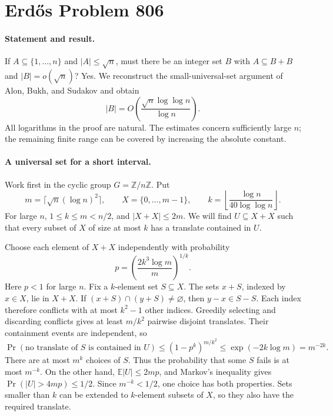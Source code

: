 \section*{Erd\H{o}s Problem 806}

\paragraph{Statement and result.}
If \(A\subseteq\{1,\ldots,n\}\) and \(|A|\leq\sqrt n\), must there be an integer set \(B\) with \(A\subseteq B+B\) and \(|B|=o(\sqrt n)\)? Yes. We reconstruct the small-universal-set argument of Alon, Bukh, and Sudakov and obtain
\[
 |B|=O\!\left(\frac{\sqrt n\log\log n}{\log n}\right).
\]
All logarithms in the proof are natural. The estimates concern sufficiently large \(n\); the remaining finite range can be covered by increasing the absolute constant.

\paragraph{A universal set for a short interval.}
Work first in the cyclic group \(G=\mathbb Z/n\mathbb Z\). Put
\[
 m=\lceil\sqrt n(\log n)^2\rceil,\qquad
 X=\{0,\ldots,m-1\},\qquad
 k=\left\lfloor\frac{\log n}{40\log\log n}\right\rfloor.
\]
For large \(n\), \(1\leq k\leq m<n/2\), and \(|X+X|\leq2m\). We will find \(U\subseteq X+X\) such that every subset of \(X\) of size at most \(k\) has a translate contained in \(U\).

Choose each element of \(X+X\) independently with probability
\[
 p=\left(\frac{2k^3\log m}{m}\right)^{1/k}.
\]
Here \(p<1\) for large \(n\). Fix a \(k\)-element set \(S\subseteq X\). The sets \(x+S\), indexed by \(x\in X\), lie in \(X+X\). If \((x+S)\cap(y+S)\ne\varnothing\), then \(y-x\in S-S\). Each index therefore conflicts with at most \(k^2-1\) other indices. Greedily selecting and discarding conflicts gives at least \(m/k^2\) pairwise disjoint translates. Their containment events are independent, so
\[
 \Pr(\text{no translate of }S\text{ is contained in }U)
 \leq(1-p^k)^{m/k^2}
 \leq\exp(-2k\log m)=m^{-2k}.
\]
There are at most \(m^k\) choices of \(S\). Thus the probability that some \(S\) fails is at most \(m^{-k}\). On the other hand,
\(\mathbb E|U|\leq2mp\), and Markov's inequality gives
\(\Pr(|U|>4mp)\leq1/2\). Since \(m^{-k}<1/2\), one choice has both properties. Sets smaller than \(k\) can be extended to \(k\)-element subsets of \(X\), so they also have the required translate.

